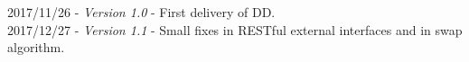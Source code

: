 2017/11/26 - \textit{Version 1.0} - First delivery of DD. \\
2017/12/27 - \textit{Version 1.1} - Small fixes in RESTful external interfaces and in swap algorithm.